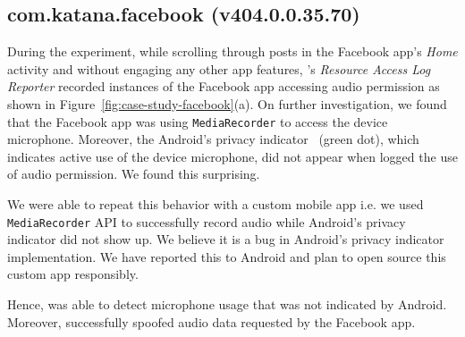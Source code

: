 \subsection{com.katana.facebook (v404.0.0.35.70)}
\label{sec:fb_case_study}

During the experiment, while scrolling through posts in the Facebook app's
\textit{Home} activity and without engaging any other app features,
\framework's \textit{Resource Access Log Reporter} recorded instances of the
Facebook app accessing audio permission as shown in
Figure~\ref{fig:case-study-facebook}(a). On further investigation, we found
that the Facebook app was using \texttt{MediaRecorder} to access the device
microphone. Moreover, the Android's privacy indicator~\cite{andPrivacyIndicator}
(green dot), which indicates active use of the device microphone, did not appear
when \framework{} logged the use of audio permission. We found this surprising.

We were able to repeat this behavior with a custom mobile app i.e. we used
\texttt{MediaRecorder} API to successfully record audio
while Android's privacy indicator did not show up. We believe it is a bug in
Android's privacy indicator implementation. We have reported this to Android and
plan to open source this custom app responsibly.

Hence, \framework{} was able to detect microphone usage that was not indicated
by Android. Moreover, \framework{} successfully spoofed audio data requested
by the Facebook app. 

